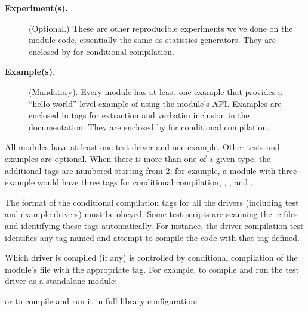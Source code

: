 \begin{description}
\item[\textbf{Experiment(s).}] (Optional.) These are other reproducible
  experiments we've done on the module code, essentially the same as
  statistics generators. They are
  enclosed by 
  for conditional compilation.

\item[\textbf{Example(s).}] (Mandatory). Every module has at least one example
   that provides a ``hello world'' level example of
  using the module's API. Examples are enclosed in 
  tags for extraction and verbatim inclusion in the documentation.
  They are enclosed by  
  for conditional compilation.
\end{description}  

All modules have at least one test driver and one example. Other tests
and examples are optional. When there is more than one 
of a given type, the additional tags are numbered starting from 2: for
example, a module with three example  would have three
tags for conditional compilation, ,
, and .

The format of the conditional compilation tags for all the drivers
(including test and example drivers) must be obeyed. Some test scripts
are scanning the .c files and identifying these tags
automatically. For instance, the driver compilation test identifies any
tag named
and attempt to compile the code with that tag defined.

Which driver is compiled (if any) is controlled by conditional
compilation of the module's  file with the appropriate
tag. For example, to compile and run the  test driver as
a standalone module:

\begin{cchunk}
\end{cchunk}

or to compile and run it in full library configuration:

\begin{cchunk}
\end{cchunk}


